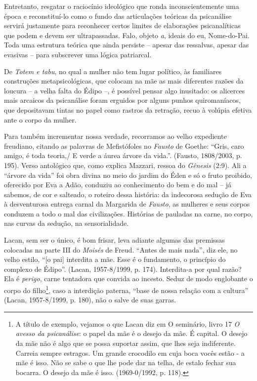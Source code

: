 Entretanto, resgatar o raciocínio ideológico que ronda inconscientemente
uma época e reconstituí-lo como o fundo das articulações teóricas da
psicanálise servirá justamente para reconhecer certos limites de
elaborações psicanalíticas que podem e devem ser ultrapassadas. Falo,
objeto \emph{a}, ideais do eu, Nome-do-Pai. Toda uma estrutura teórica
que ainda persiste -- apesar das ressalvas, apesar das evasivas -- para
subscrever uma lógica patriarcal.

De \emph{Totem e tabu}, no qual a mulher não tem lugar político, às
familiares construções metapsicológicas, que colocam na mãe as mais
diferentes razões da loucura -- a velha falta do Édipo --, é possível
pensar algo inusitado: os alicerces mais arcaicos da psicanálise foram
erguidos por alguns punhos quiromaníacos, que depositavam tintas no
papel como rastros da retração, recuo à volúpia efetiva ante o corpo da
mulher.

Para também incrementar nossa verdade, recorramos ao velho expediente
freudiano, citando as palavras de Mefistófoles no \emph{Fausto} de
Goethe: ``Gris, caro amigo, é toda teoria,/ E verde a áurea árvore da
vida.''. (Fausto, 1808/2003, p. 195). Verso antológico que, como explica
Mazzari, ressoa do \emph{Gênesis} (2:9). Ali a ``árvore da vida'' foi
obra divina no meio do jardim do Éden e só o fruto proibido, oferecido
por Eva a Adão, conduziu ao conhecimento do bem e do mal -- já sabemos,
de cor e salteado, o roteiro dessa história: da indecorosa sedução de
Eva à desventurosa entrega carnal da Margarida de \emph{Fausto}, as
mulheres e seus corpos conduzem a todo o mal das civilizações. Histórias
de pauladas na carne, no corpo, nas curvas da sedução, na
sensorialidade.

Lacan, sem ser o único, é bom frisar, leva adiante algumas das premissas
colocadas na parte III do \emph{Moisés} de Freud. ``Antes de mais
nada'', diz ele, no velho estilo, ``{[}o pai{]} interdita a mãe. Esse é
o fundamento, o princípio do complexo de Édipo''. (Lacan, 1957-8/1999,
p. 174). Interdita-a por qual razão? Ela é \emph{perigo}, carne
tentadora que convida ao incesto. Seduz de modo englobante o corpo do
filho\footnote{A título de exemplo, vejamos o que Lacan diz em O
  seminário, livro 17 \emph{O avesso da psicanálise}: o papel da mãe é o
  desejo da mãe. É capital. O desejo da mãe não é algo que se possa
  suportar assim, que lhes seja indiferente. Carreia sempre estragos. Um
  grande crocodilo em cuja boca vocês estão - a mãe é isso. Não se sabe
  o que lhe pode dar na telha, de estalo fechar sua bocarra. O desejo da
  mãe é isso. (1969-0/1992, p. 118).}, caso a interdição paterna, ``base
de nossa relação com a cultura'' (Lacan, 1957-8/1999, p. 180), não o
salve de suas garras.

